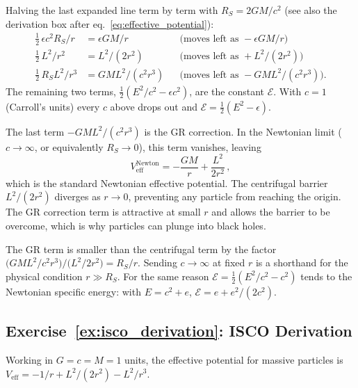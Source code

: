\begin{derivation}
Halving the last expanded line term by term with $R_S = 2GM/c^2$
(see also the derivation box after eq.~\eqref{eq:effective_potential}):
\begin{align*}
\tfrac12\,\epsilon c^2R_S/r &= \epsilon GM/r
  && \text{(moves left as } -\epsilon GM/r\text{)} \\
\tfrac12\,L^2/r^2 &= L^2/(2r^2)
  && \text{(moves left as } +L^2/(2r^2)\text{)} \\
\tfrac12\,R_SL^2/r^3 &= GML^2/(c^2r^3)
  && \text{(moves left as } -GML^2/(c^2r^3)\text{)} .
\end{align*}
The remaining two terms, $\tfrac12(E^2/c^2 - \epsilon c^2)$, are the
constant $\mathcal{E}$.  With $c = 1$ (Carroll's units) every $c$ above
drops out and $\mathcal{E} = \tfrac12(E^2 - \epsilon)$.
\end{derivation}


The last term $-GML^2/(c^2 r^3)$ is the GR
correction.  In the Newtonian limit ($c \to \infty$, or equivalently
$R_S \to 0$), this term vanishes, leaving
\[
    V_{\mathrm{eff}}^{\mathrm{Newton}} = -\frac{GM}{r} + \frac{L^2}{2r^2} \,,
\]
which is the standard Newtonian effective potential.  The centrifugal
barrier $L^2/(2r^2)$ diverges as $r \to 0$, preventing any particle from
reaching the origin.  The GR correction term is attractive at small $r$
and allows the barrier to be overcome, which is why particles can plunge
into black holes.

\begin{annotation}
The GR term is smaller than the centrifugal term by the factor
$\bigl(GML^2/c^2r^3\bigr)/\bigl(L^2/2r^2\bigr) = R_S/r$.  Sending
$c \to \infty$ at fixed $r$ is a shorthand for the physical condition
$r \gg R_S$.  For the same reason $\mathcal{E} = \tfrac12(E^2/c^2 - c^2)$ tends
to the Newtonian specific energy: with $E = c^2 + e$,
$\mathcal{E} = e + e^2/(2c^2)$.
\end{annotation}


\subsection*{Exercise~\ref{ex:isco_derivation}: ISCO Derivation}

Working in $G = c = M = 1$ units, the effective potential for massive
particles is $V_{\mathrm{eff}} = -1/r + L^2/(2r^2) - L^2/r^3$.

